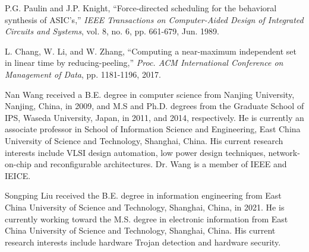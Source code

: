 \documentclass[10pt,journal, compsoc]{IEEEtran}
\begin{document}
\begin{thebibliography}{99}
P.G. Paulin and J.P. Knight, ``Force-directed scheduling for the behavioral synthesis of ASIC's,''  \textit{IEEE Transactions on Computer-Aided Design of Integrated Circuits and Systems}, vol. 8, no. 6, pp. 661-679, Jun. 1989.

L. Chang, W. Li, and W. Zhang,  ``Computing a near-maximum independent set in linear time by reducing-peeling,'' \textit{Proc. ACM International Conference on Management of Data}, pp. 1181-1196, 2017.



\end{thebibliography}

%

\begin{IEEEbiography}{Nan Wang}
received a B.E. degree in computer science from Nanjing University, Nanjing, China, in 2009, and M.S and Ph.D. degrees from the Graduate School of IPS, Waseda University, Japan, in 2011, and 2014, respectively. He is currently an associate professor in School of Information Science and Engineering, East China University of Science and Technology, Shanghai, China. His current research interests include VLSI design automation, low power design techniques, network-on-chip and reconfigurable architectures. Dr. Wang is a member of IEEE and IEICE.
\end{IEEEbiography}

\begin{IEEEbiography}{Songping Liu}
received the B.E. degree in information engineering from East China University of Science and Technology, Shanghai, China, in 2021.
He is currently working toward the M.S. degree in electronic information from East China University of Science and Technology, Shanghai, China.
His current research interests include hardware Trojan detection and hardware security.
\end{IEEEbiography}
\end{document}
